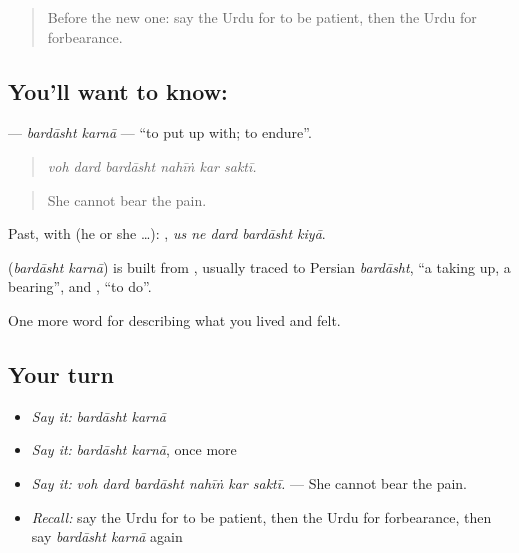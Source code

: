 \label{lesson:UR-C458-bardasht-karna}



\begin{quote}
Before the new one: say the Urdu for to be patient, then the Urdu for forbearance.
\end{quote}

\subsection*{You'll want to know:  }
\textbf{ } — \emph{bardāsht karnā} — \textquotedblleft{}to put up with; to endure\textquotedblright{}.

\begin{quote}
     
\end{quote}

\begin{quote}
\emph{voh dard bardāsht nahīṅ kar saktī.}
\end{quote}

\begin{quote}
She cannot bear the pain.
\end{quote}

Past, with  (he or she …):     , \emph{us ne dard bardāsht kiyā}.

\begin{cousinweb}
\textbf{ } (\emph{bardāsht karnā}) is built from \textbf{}, usually traced to Persian \emph{bardāsht}, \textquotedblleft{}a taking up, a bearing\textquotedblright{}, and \textbf{}, \textquotedblleft{}to do\textquotedblright{}.
\end{cousinweb}

\begin{grammarlens}[title={What you've built}]
One more word for describing what you lived and felt.
\end{grammarlens}

\subsection*{Your turn}
\begin{itemize}
\raggedright
  \item \emph{Say it:} \emph{bardāsht karnā}
  \item \emph{Say it:} \emph{bardāsht karnā}, once more
  \item \emph{Say it:} \emph{voh dard bardāsht nahīṅ kar saktī.} — She cannot bear the pain.
  \item \emph{Recall:} say the Urdu for to be patient, then the Urdu for forbearance, then say \emph{bardāsht karnā} again
\end{itemize}

